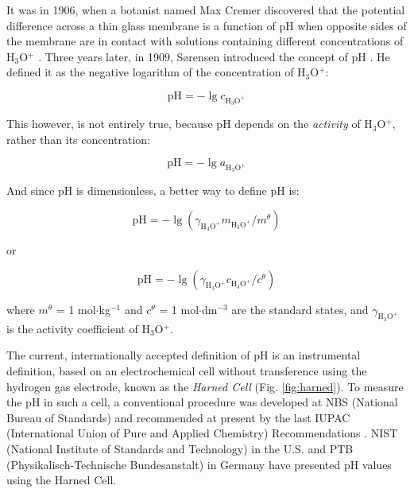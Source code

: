 It was in 1906, when a botanist named Max Cremer discovered that the potential difference across a thin glass membrane is a function of pH when opposite sides of the membrane are in contact with solutions containing different concentrations of H$_3$O$^+$ \cite{cremer1906ursache, cremer1906direkte}.
Three years later, in 1909, S\o rensen introduced the concept of pH \cite{sorensen1909messung}.
He defined it as the negative logarithm of the concentration of H$_3$O$^+$:

\begin{equation}
\textrm{pH} = -\lg c_{\textrm{H}_3\textrm{O}^+}
\end{equation}

This however, is not entirely true, because pH depends on the \emph{activity} of H$_3$O$^+$, rather than its concentration:

\begin{equation}
\textrm{pH} = -\lg a_{\textrm{H}_3\textrm{O}^+}
\end{equation}

And since pH is dimensionless, a better way to define pH is:

\begin{equation}
\textrm{pH} = -\lg(\gamma_{\textrm{H}_3\textrm{O}^+} m_{\textrm{H}_3\textrm{O}^+} / m^\theta)
\end{equation}

or

\begin{equation}
\textrm{pH} = -\lg(\gamma_{\textrm{H}_3\textrm{O}^+} c_{\textrm{H}_3\textrm{O}^+} / c^\theta)
\end{equation}

where $m^\theta$ = 1 mol$\cdot$kg$^{-1}$ and $c^\theta$ = 1 mol$\cdot$dm$^{-3}$ are the standard states, and $\gamma_{\textrm{H}_3\textrm{O}^+}$ is the activity coefficient of H$_3$O$^+$. 

The current, internationally accepted definition of pH is an instrumental definition, based on an electrochemical cell without transference using the hydrogen gas electrode, known as the \emph{Harned Cell} \cite{harned1958activity} (Fig. \ref{fig:harned}).
To measure the pH in such a cell, a conventional procedure was developed at NBS (National Bureau of Standards) \cite{durst1975standardization} and recommended at present by the last IUPAC (International Union of Pure and Applied Chemistry) Recommendations \cite{covington2002measurement}.
NIST (National Institute of Standards and Technology) in the U.S. and PTB (Physikalisch-Technische Bundesanstalt) in Germany have presented pH values using the Harned Cell. 

